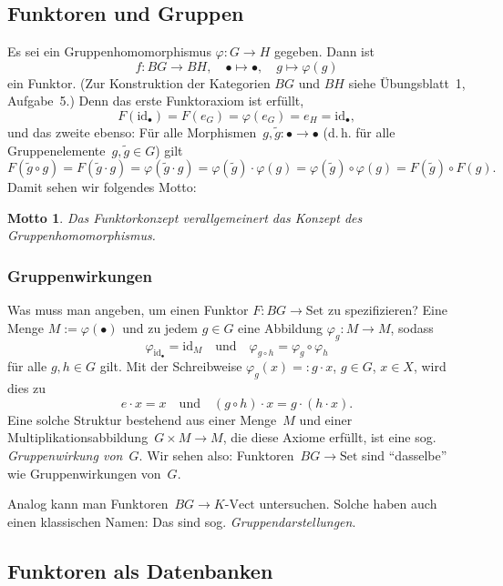 \documentclass[a4paper,ngerman]{scrartcl}
\theoremstyle{definition}
\theoremstyle{plain}
\newtheorem{motto}[defn]{Motto}
\theoremstyle{remark}
\newcommand{\id}{\mathrm{id}}
\newcommand{\Set}{\mathrm{Set}}
\newcommand{\Vect}{\mathrm{Vect}}
\begin{document}
\subsection{Funktoren und Gruppen}

Es sei ein Gruppenhomomorphismus $\varphi : G \to H$ gegeben. Dann ist
  \[ f : BG \to BH, \quad \bullet \mapsto \bullet, \quad g \mapsto \varphi(g) \]
ein Funktor. (Zur Konstruktion der Kategorien $BG$ und $BH$ siehe Übungsblatt~1, Aufgabe~5.)
Denn das erste Funktoraxiom ist erfüllt,
\[
  F(\id_\bullet) = F(e_G) = \varphi(e_G) = e_H = \id_\bullet,
\]
und das zweite ebenso: Für alle Morphismen~$g, \tilde g : \bullet \to \bullet$
(d.\,h. für alle Gruppenelemente~$g, \tilde g \in G$) gilt
\[
  F(\tilde{g} \circ g) = F(\tilde{g} \cdot g) = \varphi(\tilde{g} \cdot g) =
  \varphi(\tilde{g}) \cdot \varphi(g) = \varphi(\tilde{g}) \circ \varphi(g) =
  F(\tilde{g}) \circ F(g). \]
Damit sehen wir folgendes Motto:
\begin{motto}Das Funktorkonzept verallgemeinert das Konzept des
Gruppenhomomorphismus.\end{motto}

\subsubsection*{Gruppenwirkungen}

Was muss man angeben, um einen Funktor $F : BG \to \Set$ zu spezifizieren? Eine
Menge $M := \varphi(\bullet)$ und zu jedem $g \in G$ eine Abbildung $\varphi_g : M \to M$, sodass
\[ \varphi_{\id_\bullet} = \id_M \quad \text{und} \quad \varphi_{g \circ h} = \varphi_g \circ \varphi_h \]
für alle $g, h \in G$ gilt. Mit der Schreibweise $\varphi_g(x) =: g \cdot x$, $g \in G$, $x \in X$, wird dies zu
\[ e \cdot x = x \quad \text{und} \quad (g \circ h) \cdot x = g \cdot (h \cdot x).\]
Eine solche Struktur bestehend aus einer Menge~$M$ und einer
Multiplikationsabbildung~$G \times M \to M$, die diese Axiome erfüllt, ist eine
sog. \emph{Gruppenwirkung von~$G$}. Wir sehen also: Funktoren~$BG \to \Set$
sind "`dasselbe"' wie Gruppenwirkungen von~$G$.

Analog kann man Funktoren~$BG \to K\text{-}\Vect$ untersuchen. Solche haben
auch einen klassischen Namen: Das sind sog. \emph{Gruppendarstellungen}.


\subsection{Funktoren als Datenbanken}
\end{document}
